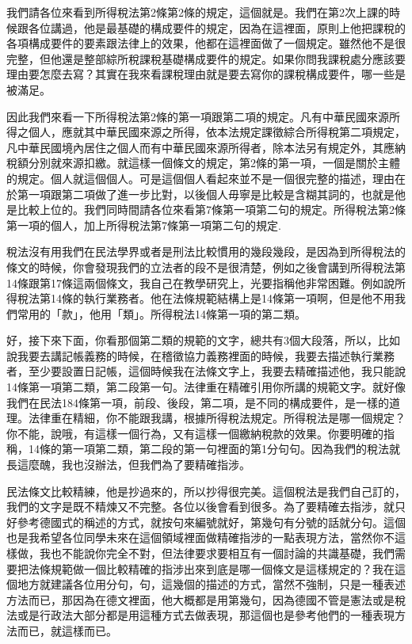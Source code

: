 \documentclass[oneside,sub3section]{ctexbook}
\begin{document}
我們請各位來看到所得稅法第2條第2條的規定，這個就是。我們在第2次上課的時候跟各位講過，他是最基礎的構成要件的規定，因為在這裡面，原則上他把課稅的各項構成要件的要素跟法律上的效果，他都在這裡面做了一個規定。雖然他不是很完整，但他還是整部綜所稅課稅基礎構成要件的規定。如果你問我課稅處分應該要理由要怎麼去寫？其實在我來看課稅理由就是要去寫你的課稅構成要件，哪一些是被滿足。

因此我們來看一下所得稅法第2條的第一項跟第二項的規定。凡有中華民國來源所得之個人，應就其中華民國來源之所得，依本法規定課徵綜合所得稅第二項規定，凡中華民國境內居住之個人而有中華民國來源所得者，除本法另有規定外，其應納稅額分別就來源扣繳。就這樣一個條文的規定，第2條的第一項，一個是關於主體的規定。個人就這個個人。可是這個個人看起來並不是一個很完整的描述，理由在於第一項跟第二項做了進一步比對，以後個人毋寧是比較是含糊其詞的，也就是他是比較上位的。我們同時間請各位來看第7條第一項第二句的規定。所得稅法第2條第一項的個人，加上所得稅法第7條第一項第二句的規定.

稅法沒有用我們在民法學界或者是刑法比較慣用的幾段幾段，是因為到所得稅法的條文的時候，你會發現我們的立法者的段不是很清楚，例如之後會講到所得稅法第14條跟第17條這兩個條文，我自己在教學研究上，光要指稱他非常困難。例如說所得稅法第14條的執行業務者。他在法條規範結構上是14條第一項啊，但是他不用我們常用的「款」，他用「類」。所得稅法14條第一項的第二類。

好，接下來下面，你看那個第二類的規範的文字，總共有3個大段落，所以，比如說我要去講記帳義務的時候，在稽徵協力義務裡面的時候，我要去描述執行業務者，至少要設置日記帳，這個時候我在法條文字上，我要去精確描述他，我只能說14條第一項第二類，第二段第一句。法律重在精確引用你所講的規範文字。就好像我們在民法184條第一項，前段、後段，第二項，是不同的構成要件，是一樣的道理。法律重在精細，你不能跟我講，根據所得稅法規定。所得稅法是哪一個規定？你不能，說哦，有這樣一個行為，又有這樣一個繳納稅款的效果。你要明確的指稱，14條的第一項第二類，第二段的第一句裡面的第1分句句。因為我們的稅法就長這麼醜，我也沒辦法，但我們為了要精確指涉。

民法條文比較精練，他是抄過來的，所以抄得很完美。這個稅法是我們自己訂的，我們的文字是既不精煉又不完整。各位以後會看到很多。為了要精確去指涉，就只好參考德國式的稱述的方式，就按句來編號就好，第幾句有分號的話就分句。這個也是我希望各位同學未來在這個領域裡面做精確指涉的一點表現方法，當然你不這樣做，我也不能說你完全不對，但法律要求要相互有一個討論的共識基礎，我們需要把法條規範做一個比較精確的指涉出來到底是哪一個條文是這樣規定的？我在這個地方就建議各位用分句，句，這幾個的描述的方式，當然不強制，只是一種表述方法而已，那因為在德文裡面，他大概都是用第幾句，因為德國不管是憲法或是稅法或是行政法大部分都是用這種方式去做表現，那這個也是參考他們的一種表現方法而已，就這樣而已。
\end{document}
